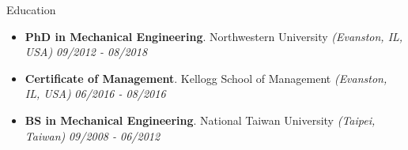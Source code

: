 \documentclass{resume} %
\begin{document}
	
	
	\begin{rSection}{Education}
		\begin{itemize}[leftmargin=0em]
			\item {\bf PhD in Mechanical Engineering}{. Northwestern University} \textit{(Evanston, IL, USA)} \hfill {\em 09/2012 - 08/2018} 
			\vspace{-0mm}
			\item {\bf Certificate of Management}{. Kellogg School of Management} \textit{(Evanston, IL, USA)} \hfill {\em 06/2016 - 08/2016} 
			\vspace{-0mm}
			\item {\bf BS in Mechanical Engineering}{. National Taiwan University} \textit{(Taipei, Taiwan)} \hfill {\em 09/2008 - 06/2012} 
			\vspace{-0mm}
		\end{itemize}
				
	\end{rSection}
	
\end{document}
